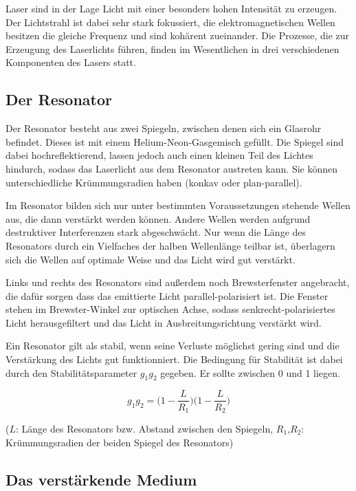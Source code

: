 Laser sind in der Lage Licht mit einer besonders hohen Intensität zu erzeugen. Der Lichtstrahl ist dabei sehr stark fokussiert,
die elektromagnetischen Wellen besitzen die gleiche Frequenz und sind kohärent zueinander. Die Prozesse, die zur
Erzeugung des Laserlichts führen, finden im Wesentlichen in drei verschiedenen Komponenten des Lasers statt.

\subsection{Der Resonator}

Der Resonator besteht aus zwei Spiegeln, zwischen denen sich ein Glasrohr befindet. Dieses ist mit einem Helium-Neon-Gasgemisch
gefüllt. Die Spiegel sind dabei hochreflektierend, lassen jedoch auch einen kleinen Teil des Lichtes hindurch, sodass das
Laserlicht aus dem Resonator austreten kann. Sie können unterschiedliche Krümmungsradien haben (konkav oder plan-parallel).

Im Resonator bilden sich nur unter bestimmten Voraussetzungen stehende Wellen aus, die dann verstärkt werden können.
Andere Wellen werden aufgrund destruktiver Interferenzen stark abgeschwächt. Nur wenn die Länge des Resonators durch ein
Vielfaches der halben Wellenlänge teilbar ist, überlagern sich die Wellen auf optimale Weise und das Licht wird gut verstärkt.

Links und rechts des Resonators sind außerdem noch Brewsterfenster angebracht, die dafür sorgen dass das emittierte Licht
parallel-polarisiert ist. Die Fenster stehen im Brewster-Winkel zur optischen Achse, sodass senkrecht-polarisiertes
Licht herausgefiltert und das Licht in Ausbreitungsrichtung verstärkt wird.

Ein Resonator gilt als stabil, wenn seine Verluste möglichst gering sind und die Verstärkung des Lichts gut funktionniert.
Die Bedingung für Stabilität ist dabei durch den Stabilitätsparameter $g_1g_2$ gegeben. Er sollte zwischen 0 und 1 liegen.

\begin{equation}
  g_1g_2 = \biggl(1-\frac{L}{R_1}\biggr)\biggl(1-\frac{L}{R_2}\biggr)
\end{equation}

($L$: Länge des Resonators bzw. Abstand zwischen den Spiegeln, $R_1$,$R_2$: Krümmungsradien der beiden Spiegel des Resonators)

\subsection{Das verstärkende Medium}

